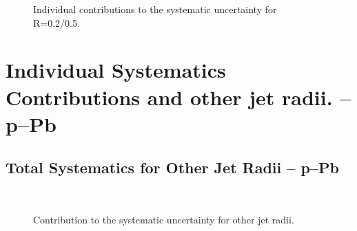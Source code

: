 \begin{figure}[h!]
    \qquad
    \caption{Individual contributions to the systematic uncertainty for R=0.2/0.5.}
    \label{fig:IndividualSysRatiosR05}
\end{figure}

\newpage

\section{Individual Systematics Contributions and other jet radii. -- p--Pb}
\label{sec:AppendixSystematicspPb}

\subsection{Total Systematics for Other Jet Radii -- p--Pb}
\label{subsec:appendixTotalSystematicspPb}

\begin{figure}[h!]
    \centering
    \qquad
    \\
    \caption{Contribution to the systematic uncertainty for other jet radii.}
    \label{fig:TotalSysOtherRpPb}
\end{figure}

